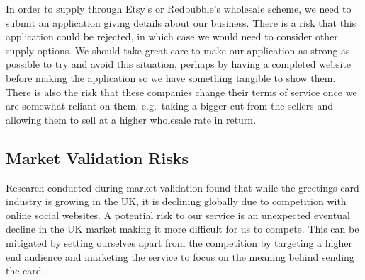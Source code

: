 \documentclass[10pt,a4paper]{article}
\begin{document}
In order to supply through Etsy's or Redbubble's wholesale scheme, we need to submit an application giving details about our business. There is a risk that this application could be rejected, in which case we would need to consider other supply options. We should take great care to make our application as strong as possible to try and avoid this situation, perhaps by having a completed website before making the application so we have something tangible to show them. There is also the risk that these companies change their terms of service once we are somewhat reliant on them, e.g.\ taking a bigger cut from the sellers and allowing them to sell at a higher wholesale rate in return.

\subsection*{Market Validation Risks}
Research conducted during market validation found that while the greetings card industry is growing in the UK, it is declining globally due to competition with online social websites. A potential risk to our service is an unexpected eventual decline in the UK market making it more difficult for us to compete. This can be mitigated by setting ourselves apart from the competition by targeting a higher end audience and marketing the service to focus on the meaning behind sending the card.










\clearpage
\end{document}
